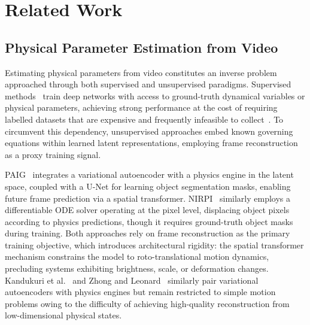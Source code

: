 \documentclass[runningheads]{llncs}
\begin{document}
\section{Related Work}
\label{sec:related}

\subsection{Physical Parameter Estimation from Video}
\label{sec:related_phys_estimation}

Estimating physical parameters from video constitutes an inverse problem approached through both supervised and unsupervised paradigms. Supervised methods~\cite{asenov2019vid2param, de2018end, watters2017visual, wu2015galileo, wu2017learning, yang2022learning, zheng2018unsupervised} train deep networks with access to ground-truth dynamical variables or physical parameters, achieving strong performance at the cost of requiring labelled datasets that are expensive and frequently infeasible to collect~\cite{toth2019hamiltonian}. To circumvent this dependency, unsupervised approaches embed known governing equations within learned latent representations, employing frame reconstruction as a proxy training signal.

PAIG~\cite{jaques2019physics} integrates a variational autoencoder with a physics engine in the latent space, coupled with a U-Net for learning object segmentation masks, enabling future frame prediction via a spatial transformer. NIRPI~\cite{hofherr2023neural} similarly employs a differentiable ODE solver operating at the pixel level, displacing object pixels according to physics predictions, though it requires ground-truth object masks during training. Both approaches rely on frame reconstruction as the primary training objective, which introduces architectural rigidity: the spatial transformer mechanism constrains the model to roto-translational motion dynamics, precluding systems exhibiting brightness, scale, or deformation changes. Kandukuri et al.~\cite{kandukuri2020learning} and Zhong and Leonard~\cite{zhong2020unsupervised} similarly pair variational autoencoders with physics engines but remain restricted to simple motion problems owing to the difficulty of achieving high-quality reconstruction from low-dimensional physical states.
\end{document}
